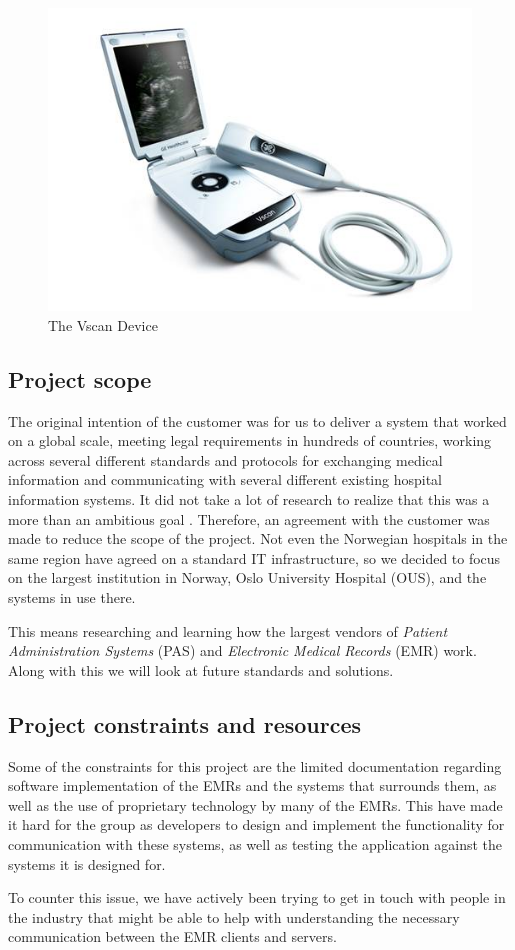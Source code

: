 \begin{figure}[H]
\centering
\includegraphics[scale=0.60]{img/vscan.jpg}
\caption{The Vscan Device}
\label{vscandevice}
\end{figure}

\subsection{Project scope}
The original intention of the customer was for us to deliver a system that worked on a global scale, meeting legal requirements in hundreds of countries, working across several different standards and protocols for exchanging medical information and communicating with several different existing hospital information systems. It did not take a lot of research to realize that this was a more than an ambitious goal \cite{metricFuckton}. Therefore, an agreement with the customer was made to reduce the scope of the project. Not even the Norwegian hospitals in the same region have agreed on a standard IT infrastructure, so we decided to focus on the largest institution in Norway, Oslo University Hospital (OUS), and the systems in use there.

This means researching and learning how the largest vendors of \emph{Patient Administration Systems} (PAS) and \emph{Electronic Medical Records} (EMR) work. Along with this we will look at future standards and solutions.

\subsection{Project constraints and resources}
Some of the constraints for this project are the limited documentation regarding software implementation of the EMRs and the systems that surrounds them, as well as the use of proprietary technology by many of the EMRs. This have made it hard for the group as developers to design and implement the functionality for communication with these systems, as well as testing the application against the systems it is designed for. 

To counter this issue, we have actively been trying to get in touch with people in the industry that might be able to help with understanding the necessary communication between the EMR clients and servers.